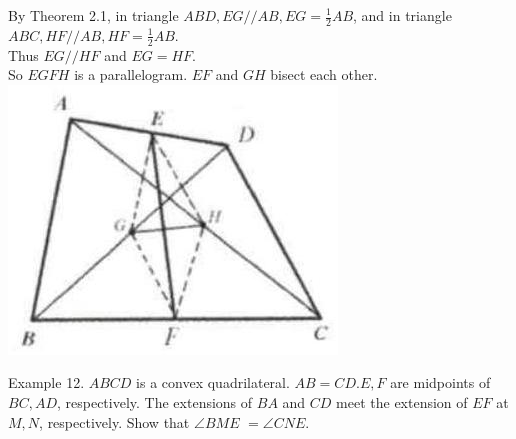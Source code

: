 \documentclass[10pt]{article}
\begin{document}
By Theorem 2.1, in triangle \(A B D, E G / / A B, E G=\frac{1}{2} A B\), and in triangle \(A B C, H F / / A B, H F=\frac{1}{2} A B\).\\
Thus \(E G / / H F\) and \(E G=H F\).\\
So \(E G F H\) is a parallelogram. \(E F\) and \(G H\) bisect each other.\\
\includegraphics[max width=\textwidth, center]{2025_04_17_97bc1f7e44d93c271a88g-042(1)}

Example 12. \(A B C D\) is a convex quadrilateral. \(A B=C D . E, F\) are midpoints of \(B C, A D\), respectively. The extensions of \(B A\) and \(C D\) meet the extension of \(E F\) at \(M, N\), respectively. Show that \(\angle B M E\) \(=\angle C N E\).
\end{document}
